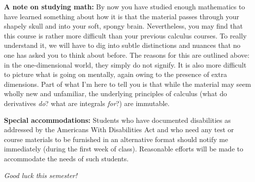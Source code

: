\documentclass[12pt,twoside]{amsart}
\begin{document}
\textbf{A note on studying math:} By now you have studied enough mathematics to have learned something about how it is that the material passes through your shapely skull and into your soft, spongy brain. Nevertheless, you may find that this course is rather more difficult than your previous calculus courses. To really understand it, we will have to dig into subtle distinctions and nuances that no one has asked you to think about before. The reasons for this are outlined above: in the one-dimensional world, they simply do not signify. It is also more difficult to picture what is going on mentally, again owing to the presence of extra dimensions. Part of what I'm here to tell you is that while the material may seem wholly new and unfamiliar, the underlying principles of calculus (what do derivatives \emph{do}? what are integrals \emph{for}?) are immutable.

\textbf{Special accommodations:} Students who have documented disabilities as addressed by the Americans With Disabilities Act and who need any test or course materials to be furnished in an alternative format should notify me immediately (during the first week of class).  Reasonable efforts will be made to accommodate the needs of such students.

\begin{center}
\emph{ {\LARGE Good luck this semester!} }
\end{center}
\end{document}
